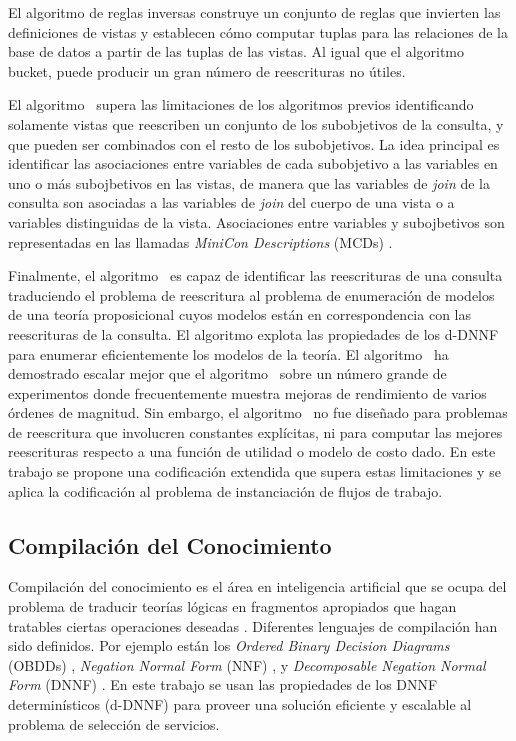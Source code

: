 El algoritmo de reglas inversas construye un conjunto de reglas que invierten
las definiciones de vistas y establecen cómo computar tuplas para las relaciones
de la base de datos a partir de las tuplas de las vistas. Al igual que el algoritmo
bucket, puede producir un gran número de reescrituras no útiles.

El algoritmo \minicon\ supera las limitaciones de los algoritmos previos
identificando solamente vistas que reescriben un conjunto de los subobjetivos de
la consulta, y que pueden ser combinados con el resto de los subobjetivos. La
idea principal es identificar las asociaciones entre variables de cada
subobjetivo a las variables en uno o más subojbetivos en las vistas, de manera
que las variables de \emph{join} de la consulta son asociadas a las variables de
\emph{join}
del cuerpo de una vista o a variables distinguidas de la vista. Asociaciones
entre variables y subojbetivos son representadas en las llamadas \emph{MiniCon
Descriptions} (MCDs) \cite{pottinger:minicon}.

Finalmente, el algoritmo \mcdsat\ es capaz de identificar las reescrituras de una
consulta traduciendo el problema de reescritura al problema de enumeración de
modelos de una teoría proposicional cuyos modelos están en correspondencia con
las reescrituras de la consulta. El algoritmo explota las propiedades de los
d-DNNF para enumerar eficientemente los modelos de la teoría.
El algoritmo
\mcdsat\ ha demostrado escalar mejor que el algoritmo \minicon\ sobre un número
grande de experimentos donde frecuentemente muestra mejoras de rendimiento de
varios órdenes de magnitud. Sin embargo, el algoritmo \mcdsat\ no fue diseñado
para problemas de reescritura que involucren constantes explícitas, ni para
computar las mejores reescrituras respecto a una función de utilidad o modelo de
costo dado. En este trabajo se propone una codificación extendida que supera
estas limitaciones y se aplica la codificación al problema de instanciación de
flujos de trabajo.

\subsection{Compilación del Conocimiento}

Compilación del conocimiento es el área en inteligencia artificial que se ocupa
del problema de traducir teorías lógicas en fragmentos apropiados que hagan
tratables ciertas operaciones deseadas \cite{cadoli:compilation}. Diferentes lenguajes de
compilación han sido definidos. Por ejemplo están los \emph{Ordered
Binary Decision Diagrams} (OBDDs) \cite{bryant:obdd},
\emph{Negation Normal Form} (NNF) \cite{barwise:handbook}, y
\emph{Decomposable Negation Normal Form} (DNNF) \cite{darwiche:map}. En este trabajo se usan las
propiedades de los DNNF determinísticos (d-DNNF) \cite{darwiche:d-dnnfs} para proveer una
solución eficiente y escalable al problema de selección de servicios.

